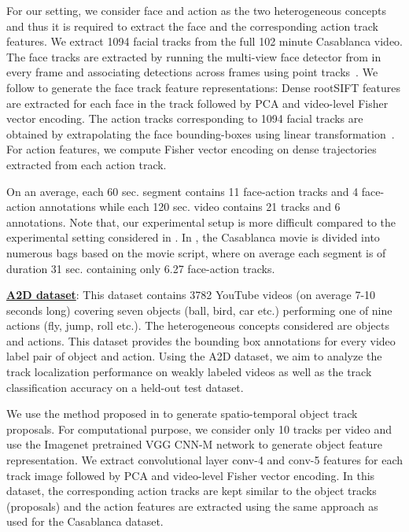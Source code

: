 \documentclass[runningheads]{llncs}
\begin{document}
For our setting, we consider face and action as the two heterogeneous concepts and thus it is required to extract the face and the corresponding action track features. We extract 1094 facial tracks from the full 102 minute Casablanca video. The face tracks are extracted by running the multi-view face detector from  \cite{ZhuR_CVPR_2012} in every frame and associating detections across frames using point tracks~\cite{everingham2006hello}. We follow \cite{parkhi2014compact} to generate the face track feature representations: Dense rootSIFT features are extracted for each face in the track followed by PCA and video-level Fisher vector encoding. The action tracks corresponding to 1094 facial tracks are obtained by extrapolating the face bounding-boxes using linear transformation~\cite{bojanowski2013finding}. For action features, we compute Fisher vector encoding on dense trajectories \cite{wang2013action} extracted from each action track. 

On an average, each 60 sec. segment contains 11 face-action tracks and 4 face-action annotations while each 120 sec. video contains 21 tracks and 6 annotations. Note that, our experimental setup is  more difficult compared to the experimental setting considered in \cite{bojanowski2013finding}. In \cite{bojanowski2013finding}, the Casablanca movie is divided into numerous bags based on the movie script, where on average each segment is of duration 31 sec. containing only 6.27 face-action tracks.

\noindent
\underline{\bf A2D dataset}: This dataset \cite{xu2015can} contains 3782 YouTube videos (on average 7-10 seconds long) covering seven objects (ball, bird, car etc.) performing one of nine actions (fly, jump, roll etc.). The heterogeneous concepts considered are objects and actions. This dataset provides the bounding box annotations for every video label pair of object and action. Using the A2D dataset, we aim to analyze the track localization performance on weakly labeled videos as well as the track classification accuracy on a held-out test dataset. %

We use the method proposed in \cite{oneata2014spatio} to generate spatio-temporal object track proposals. For computational purpose, we consider only 10 tracks per video and use the Imagenet pretrained VGG CNN-M network \cite{Chatfield14} to generate object feature representation. We extract convolutional layer conv-4 and conv-5 features for each track image followed by PCA and video-level Fisher vector encoding. In  this dataset, the corresponding action tracks are kept similar to the object tracks (proposals) and the action features are extracted using the same approach as used for the Casablanca dataset.
\end{document}
